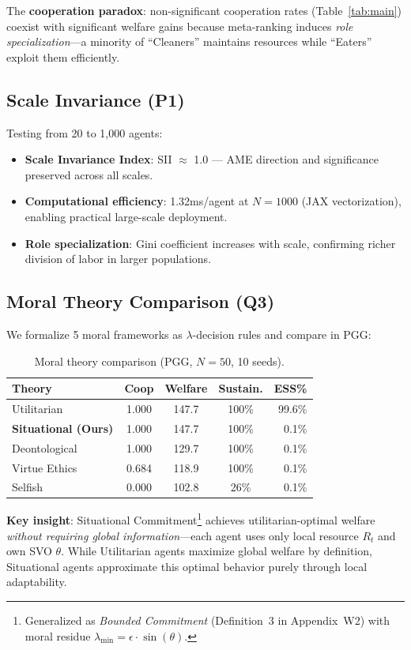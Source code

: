 \documentclass{article}
\begin{document}
The \textbf{cooperation paradox}: non-significant cooperation rates (Table~\ref{tab:main}) coexist with significant welfare gains because meta-ranking induces \textit{role specialization}---a minority of ``Cleaners'' maintains resources while ``Eaters'' exploit them efficiently.

\subsection{Scale Invariance (P1)}

Testing from 20 to 1,000 agents:
\begin{itemize}
    \item \textbf{Scale Invariance Index}: SII $\approx$ 1.0 --- AME direction and significance preserved across all scales.
    \item \textbf{Computational efficiency}: 1.32ms/agent at $N{=}1000$ (JAX vectorization), enabling practical large-scale deployment.
    \item \textbf{Role specialization}: Gini coefficient increases with scale, confirming richer division of labor in larger populations.
\end{itemize}

\subsection{Moral Theory Comparison (Q3)}

We formalize 5 moral frameworks as $\lambda$-decision rules and compare in PGG:

\begin{table}[h]
\centering
\caption{Moral theory comparison (PGG, $N{=}50$, 10 seeds).}
\label{tab:moral}
\begin{tabular}{lcccr}
\toprule
Theory & Coop & Welfare & Sustain. & ESS\% \\
\midrule
Utilitarian & 1.000 & 147.7 & 100\% & 99.6\% \\
\textbf{Situational (Ours)} & 1.000 & 147.7 & 100\% & 0.1\% \\
Deontological & 1.000 & 129.7 & 100\% & 0.1\% \\
Virtue Ethics & 0.684 & 118.9 & 100\% & 0.1\% \\
Selfish & 0.000 & 102.8 & 26\% & 0.1\% \\
\bottomrule
\end{tabular}
\end{table}

\textbf{Key insight}: Situational Commitment\footnote{Generalized as \textit{Bounded Commitment} (Definition~3 in Appendix~W2) with moral residue $\lambda_{\min} = \epsilon \cdot \sin(\theta)$.} achieves utilitarian-optimal welfare \textit{without requiring global information}---each agent uses only local resource $R_t$ and own SVO $\theta$. While Utilitarian agents maximize global welfare by definition, Situational agents approximate this optimal behavior purely through local adaptability.
\end{document}
